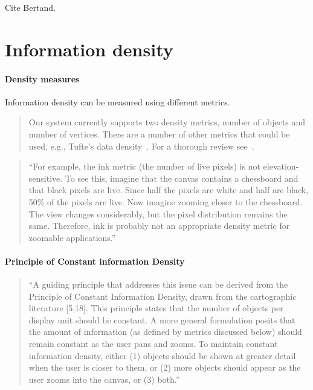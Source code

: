 \documentclass[11pt, oneside]{report}   	%
\begin{document}
Cite Bertand.

\section{Information density}

\paragraph{Density measures}

Information density can be measured using different metrics.

\begin{quote}
Our system currently supports two density metrics, number of objects and number of vertices. There are a number of other metrics that could be used, e.g., Tufte's data density~\cite{tufte1983visual}. For a thorough review see~\cite{nickerson1994visual}.
\end{quote}

\begin{quote}
``For example, the ink metric (the number of live pixels) is not elevation-sensitive. To see this, imagine that the canvas contains a chessboard and that black pixels are live. Since half the pixels are white and half are black, 50\% of the pixels are live. Now imagine zooming closer to the chessboard. The view changes considerably, but the pixel distribution remains the same. Therefore, ink is probably not an appropriate density metric for zoomable applications.''
\end{quote}

\paragraph{Principle of Constant information Density}

\begin{quote}
``A guiding principle that addresses this issue can be derived from the Principle of Constant Information Density, drawn from the cartographic literature [5,18]. This principle states that the number of objects per display unit should be constant. A more general formulation posits that the amount of information (as defined by metrics discussed below) should remain constant as the user pans and zooms. To maintain constant information density, either (1) objects should be shown at greater detail when the user is closer to them, or (2) more objects should appear as the user zooms into the canvas, or (3) both.''
\end{quote}
\end{document}
